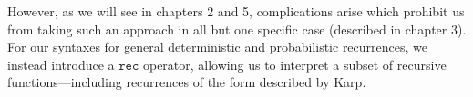  However, as we will see in chapters 2 and 5,  complications arise which  prohibit us from taking
 such an approach in all but one specific case (described in chapter 3). 
 For our syntaxes for general deterministic and probabilistic recurrences, we instead introduce a $\texttt{rec}$ 
 operator, allowing us to interpret a subset of recursive functions---including recurrences of the form
 described by Karp.
 

